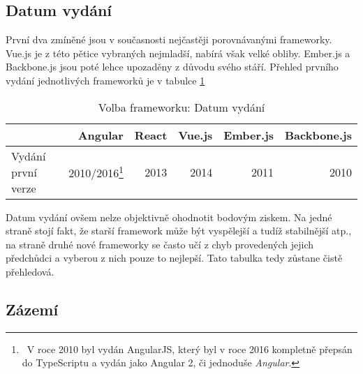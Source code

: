 
\subsection{Datum vydání}

První dva zmíněné jsou v současnosti nejčastěji porovnávanými frameworky. Vue.js je z této pětice vybraných nejmladší, nabírá však velké obliby. Ember.js a Backbone.js jsou poté lehce upozaděny z důvodu svého stáří. Přehled prvního vydání jednotlivých frameworků je v tabulce \ref{table:compare:release}

\begin{table}[h]
\caption{Volba frameworku: Datum vydání}
\label{table:compare:release}
\begin{tabular}{lrrrrr}
\hline
                                         & Angular                     & React                     & Vue.js                     & Ember.js                     & Backbone.js               \\ \hline
Vydání první verze                       & 2010/2016\footnote{\ V roce 2010 byl vydán AngularJS, který byl v roce 2016 kompletně přepsán do TypeScriptu a vydán jako Angular 2, či jednoduše \emph{Angular}.}                                                                       & 2013                      & 2014                       & 2011                         & 2010                      \\
\end{tabular}
\end{table}

Datum vydání ovšem nelze objektivně ohodnotit bodovým ziskem. Na jedné straně stojí fakt, že starší framework může být vyspělejší a tudíž stabilnější atp., na straně druhé nové frameworky se často učí z chyb provedených jejich předchůdci a vyberou z nich pouze to nejlepší. Tato tabulka tedy zůstane čistě přehledová.


\subsection{Zázemí}

